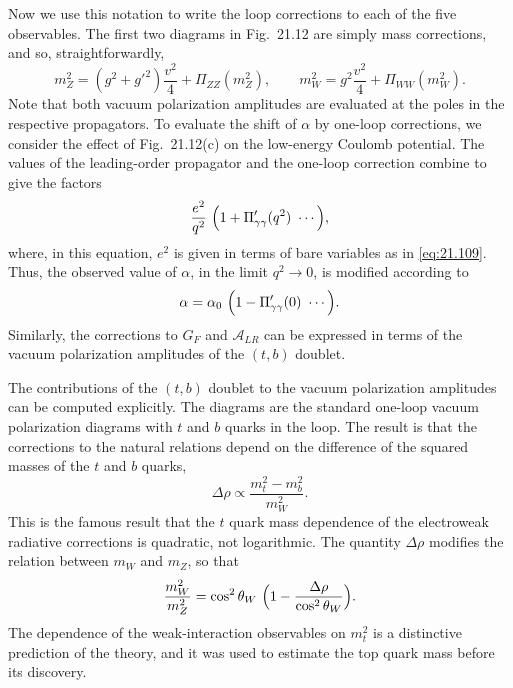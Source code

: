 Now we use this notation to write the loop corrections to each of the five
observables.  The first two diagrams in Fig.~21.12 are simply mass
corrections, and so, straightforwardly,
\begin{equation}
  m_Z^2 = (g^2 + g'^2)\frac{v^2}{4} + \Pi_{ZZ}(m_Z^2),\qquad
  m_W^2 = g^2\frac{v^2}{4} + \Pi_{WW}(m_W^2) .
  \label{eq:21.118}
\end{equation}
Note that both vacuum polarization amplitudes are evaluated at the poles in
the respective propagators.  To evaluate the shift of $\alpha$ by one-loop
corrections, we consider the effect of Fig.~21.12(c) on the
low-energy Coulomb potential.  The values of the leading-order propagator and
the one-loop correction combine to give the factors
\begin{equation}
  \frac{e^2}{q^2}\ \Bigl( 1 + \Pi'_{\gamma\gamma}(q^2)\ \cdots \Bigr) ,
  \label{eq:21.119}
\end{equation}
where, in this equation, $e^2$ is given in terms of bare variables as in
\eqref{eq:21.109}.  Thus, the observed value of $\alpha$, in the limit
$q^2\to 0$, is modified according to
\begin{equation}
  \alpha = \alpha_0\ \Bigl( 1 - \Pi'_{\gamma\gamma}(0)\ \cdots \Bigr) .
  \label{eq:21.120}
\end{equation}
Similarly, the corrections to $G_F$ and $\mathcal{A}_{LR}$ can be expressed
in terms of the vacuum polarization amplitudes of the $(t,b)$ doublet.

The contributions of the $(t, b)$ doublet to the vacuum polarization
amplitudes can be computed explicitly.  The diagrams are the standard
one-loop vacuum polarization diagrams with $t$ and $b$ quarks in the loop.
The result is that the corrections to the natural relations depend on the
difference of the squared masses of the $t$ and $b$ quarks,
\begin{equation}
  \Delta\rho \propto \frac{m_t^2 - m_b^2}{m_W^2} .
  \label{eq:21.121}
\end{equation}
This is the famous result that the $t$ quark mass dependence of the
electroweak radiative corrections is quadratic, not logarithmic.  The
quantity $\Delta\rho$ modifies the relation between $m_W$ and $m_Z$, so that
\begin{equation}
  \frac{m_W^2}{m_Z^2} = \cos^2\theta_W\ \Bigl( 1 - \frac{\Delta\rho}
    {\cos^2\theta_W} \Bigr) .
  \label{eq:21.122}
\end{equation}
The dependence of the weak-interaction observables on $m_t^2$ is a distinctive
prediction of the theory, and it was used to estimate the top quark mass
before its discovery.

